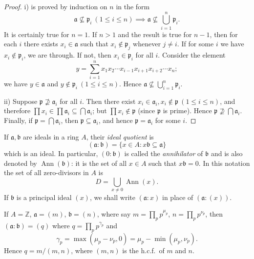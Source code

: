 \begin{proof}
i) is proved by induction on $n$ in the form
\[
\mathfrak{a} \not\subseteq \mathfrak{p}_i\ (1 \le i \le n) \implies \mathfrak{a} \not\subseteq \bigcup_{i=1}^{n} \mathfrak{p}_i.
\]
It is certainly true for $n = 1$. If $n > 1$ and the result is true for $n - 1$, then for each $i$ there exists $x_i \in \mathfrak{a}$ such that $x_i \notin \mathfrak{p}_j$ whenever $j \neq i$. If for some $i$ we have $x_i \notin \mathfrak{p}_i$, we are through. If not, then $x_i \in \mathfrak{p}_i$ for all $i$. Consider the element
\[
y = \sum_{i=1}^{n} x_1 x_2 \cdots x_{i-1} x_{i+1} x_{i+2} \cdots x_n;
\]
we have $y \in \mathfrak{a}$ and $y \notin \mathfrak{p}_i\ (1 \le i \le n)$. Hence $\mathfrak{a} \not\subseteq \bigcup_{i=1}^{n} \mathfrak{p}_i$.

ii) Suppose $\mathfrak{p} \not\supseteq \mathfrak{a}_i$ for all $i$. Then there exist $x_i \in \mathfrak{a}_i, x_i \notin \mathfrak{p}\ (1 \le i \le n)$, and therefore $\prod x_i \in \prod \mathfrak{a}_i \subseteq \bigcap \mathfrak{a}_i$; but $\prod x_i \notin \mathfrak{p}$ (since $\mathfrak{p}$ is prime). Hence $\mathfrak{p} \not\supseteq \bigcap \mathfrak{a}_i$. Finally, if $\mathfrak{p} = \bigcap \mathfrak{a}_i$, then $\mathfrak{p} \subseteq \mathfrak{a}_i$, and hence $\mathfrak{p} = \mathfrak{a}_i$ for some $i$.
\end{proof}

If $\mathfrak{a}, \mathfrak{b}$ are ideals in a ring $A$, their \emph{ideal quotient} is
\[
(\mathfrak{a} : \mathfrak{b}) = \{x \in A : x\mathfrak{b} \subseteq \mathfrak{a}\}
\]
which is an ideal. In particular, $(0 : \mathfrak{b})$ is called the \emph{annihilator} of $\mathfrak{b}$ and is also denoted by $\operatorname{Ann}(\mathfrak{b})$: it is the set of all $x \in A$ such that $x\mathfrak{b} = 0$. In this notation the set of all zero-divisors in $A$ is
\[
D = \bigcup_{x \neq 0} \operatorname{Ann}(x).
\]
If $\mathfrak{b}$ is a principal ideal $(x)$, we shall write $(\mathfrak{a} : x)$ in place of $(\mathfrak{a} : (x))$.

\begin{example}
    If $A = \mathbb{Z}$, $\mathfrak{a} = (m)$, $\mathfrak{b} = (n)$, where say $m = \prod_p p^{\mu_p}$, $n = \prod_p p^{\nu_p}$, then $(\mathfrak{a} : \mathfrak{b}) = (q)$ where $q = \prod_p p^{\gamma_p}$ and
    \[
    \gamma_p = \max(\mu_p - \nu_p, 0) = \mu_p - \min(\mu_p, \nu_p).
    \]
    Hence $q = m/(m, n)$, where $(m, n)$ is the h.c.f.\ of $m$ and $n$.
\end{example}

